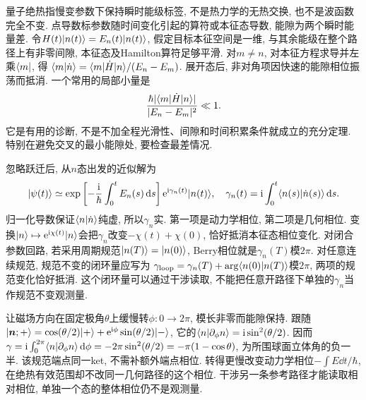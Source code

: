 量子绝热指慢变参数下保持瞬时能级标签, 不是热力学的无热交换, 也不是波函数完全不变. 点导数标参数随时间变化引起的算符或本征态导数, 能隙为两个瞬时能量差. 令$H(t)\lvert n(t)\rangle=E_n(t)\lvert n(t)\rangle$, 假定目标本征空间是一维, 与其余能级在整个路径上有非零间隙, 本征态及Hamilton算符足够平滑. 对$m\ne n$, 对本征方程求导并左乘$\langle m\rvert$, 得
$\langle m\vert \dot n\rangle=\langle m\rvert\dot H\lvert n\rangle/(E_n-E_m)$. 展开态后, 非对角项因快速的能隙相位振荡而抵消. 一个常用的局部小量是
\[
\frac{\hbar|\langle m\rvert\dot H\lvert n\rangle|}{|E_n-E_m|^2}\ll1.
\]
它是有用的诊断, 不是不加全程光滑性、间隙和时间积累条件就成立的充分定理. 特别在避免交叉的最小能隙处, 要检查最差情况.

忽略跃迁后, 从$n$态出发的近似解为
\[
\lvert \psi(t)\rangle\simeq
\exp\left[-\frac{\mathrm i}{\hbar}\int_0^tE_n(s)\,\mathrm d s\right]
\mathrm e^{\mathrm i\gamma_n(t)}\lvert n(t)\rangle,
\quad \gamma_n(t)=\mathrm i\int_0^t\langle n(s)\vert \dot n(s)\rangle\,\mathrm d s.
\]
归一化导数保证$\langle n\vert \dot n\rangle$纯虚, 所以$\gamma_n$实. 第一项是动力学相位, 第二项是几何相位. 变换$\lvert n\rangle\mapsto\mathrm e^{\mathrm i\chi(t)}\lvert n\rangle$会把$\gamma_n$改变$-\chi(t)+\chi(0)$, 恰好抵消本征态相位变化. 对闭合参数回路, 若采用周期规范$\lvert n(T)\rangle=\lvert n(0)\rangle$, Berry相位就是$\gamma_n(T)$模$2\pi$. 对任意连续规范, 规范不变的闭环量应写为 $\gamma_{\rm loop}=\gamma_n(T)+\arg\langle n(0)\vert n(T)\rangle$模$2\pi$, 两项的规范变化恰好抵消. 这个闭环量可以通过干涉读取, 不能把任意开路径下单独的$\gamma_n$当作规范不变观测量.

让磁场方向在固定极角$\theta$上缓慢转$\phi:0\to2\pi$, 模长非零而能隙保持. 跟随$\lvert \boldsymbol n;+\rangle=\cos(\theta/2)\lvert +\rangle+\mathrm e^{\mathrm i\phi}\sin(\theta/2)\lvert -\rangle$, 它的$\langle n\vert \partial_\phi n\rangle=\mathrm i\sin^2(\theta/2)$. 因而$\gamma=\mathrm i\int_0^{2\pi}\langle n\vert \partial_\phi n\rangle\,\mathrm d\phi=-2\pi\sin^2(\theta/2)=-\pi(1-\cos\theta)$, 为所围球面立体角的负一半. 该规范端点同一ket, 不需补额外端点相位. 转得更慢改变动力学相位$-\int E\dd t/\hbar$, 在绝热有效范围却不改同一几何路径的这个相位. 干涉另一条参考路径才能读取相对相位, 单独一个态的整体相位仍不是观测量.

